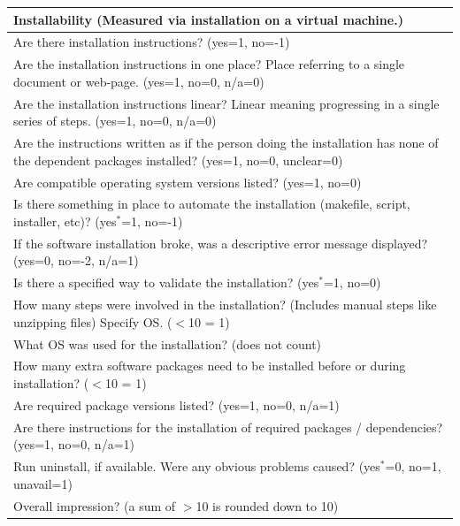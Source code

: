 \documentclass[letterpaper,cleveref]{lipics-v2019}
\begin{document}
\def\arraystretch{1.5}
\begin{tabular}{p{14cm}}
	\hline		
	\textbf{Installability (Measured via installation on a virtual machine.) }\\
	\hline
	Are there installation instructions? ({yes=1, no=-1})\\
	Are the installation instructions in one place? Place referring to a single
	document or web-page. ({yes=1, no=0, n/a=0})\\
	Are the installation instructions linear? Linear meaning progressing  in a
	single series of steps. ({yes=1, no=0, n/a=0})\\
	Are the instructions written as if the person doing the installation has none
	of the dependent packages installed? ({yes=1, no=0, unclear=0})\\
	Are compatible operating system versions listed? ({yes=1, no=0})\\
	Is there something in place to automate the installation (makefile, script,
	installer, etc)? ({yes$^*$=1, no=-1})\\
	If the software installation broke, was a descriptive error message displayed?
	({yes=0, no=-2, n/a=1})\\
	Is there a specified way to validate the installation? ({yes$^*$=1, no=0})\\
	How many steps were involved in the installation? (Includes manual steps like
	unzipping files) Specify OS. ($<$10 = 1)\\
	What OS was used for the installation? (does not count)\\
	How many extra software packages need to be installed before or during
	installation? ($<$10 = 1)\\
	Are required package versions listed? ({yes=1, no=0, n/a=1})\\
	Are there instructions for the installation of required packages /
	dependencies? ({yes=1, no=0, n/a=1})\\
	Run uninstall, if available. Were any obvious problems caused? ({yes$^*$=0, no=1,
	unavail=1})\\
	Overall impression? (a sum of $>$10 is rounded down to 10)\\
	\hline
\end{tabular}
\end{document}
